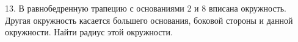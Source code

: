13. В равнобедренную трапецию с основаниями 2 и 8 вписана окружность. Другая окружность касается большего основания, боковой стороны и данной окружности. Найти радиус этой окружности.\\
